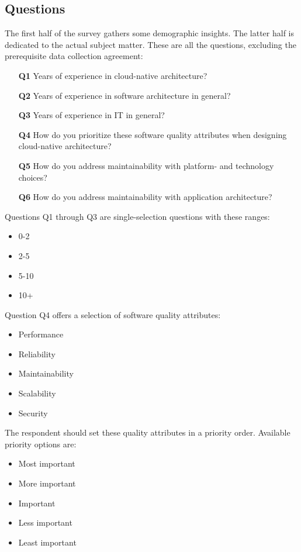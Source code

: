 \documentclass[utf8,english]{gradu3}
\begin{document}
\subsection{Questions}
The first half of the survey gathers some demographic insights.
The latter half is dedicated to the actual subject matter.
These are all the questions, excluding the prerequisite data collection agreement:
\begin{enumerate}
  \item [\textbf{Q1}] Years of experience in cloud-native architecture?
  \item [\textbf{Q2}] Years of experience in software architecture in general?
  \item [\textbf{Q3}] Years of experience in IT in general?
  \item [\textbf{Q4}] How do you prioritize these software quality attributes when designing cloud-native
        architecture?
  \item [\textbf{Q5}] How do you address maintainability with platform- and technology choices?
  \item [\textbf{Q6}] How do you address maintainability with application architecture?
\end{enumerate}

Questions Q1 through Q3 are single-selection questions with these ranges:
\begin{itemize}
  \item 0-2
  \item 2-5
  \item 5-10
  \item 10+
\end{itemize}

Question Q4 offers a selection of software quality attributes:
\begin{itemize}
  \item Performance
  \item Reliability
  \item Maintainability
  \item Scalability
  \item Security
\end{itemize}

The respondent should set these quality attributes in a priority order.
Available priority options are:
\begin{itemize}
  \item Most important
  \item More important
  \item Important
  \item Less important
  \item Least important
\end{itemize}
\end{document}
